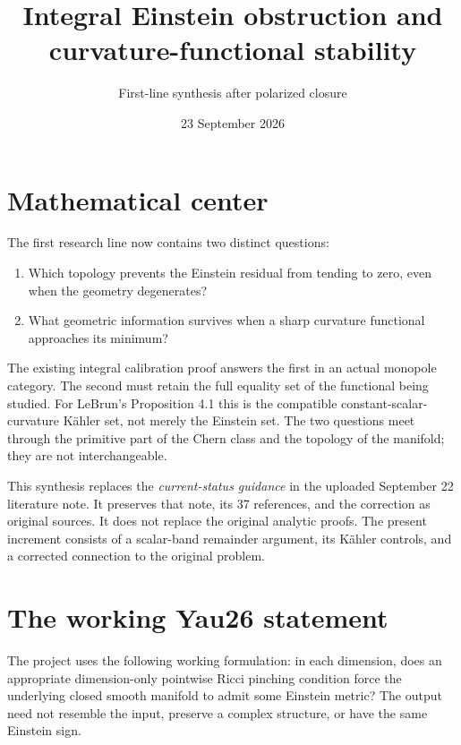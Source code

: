 \documentclass[
  11pt,
]{article}
\title{Integral Einstein obstruction and curvature-functional stability}
\subtitle{First-line synthesis after polarized closure}
\author{}
\date{23 September 2026}
\providecommand{\tightlist}{%
  \setlength{\itemsep}{0pt}\setlength{\parskip}{0pt}}
\begin{document}
\maketitle

\hypertarget{mathematical-center}{%
\section{Mathematical center}\label{mathematical-center}}

The first research line now contains two distinct questions:

\begin{enumerate}
\def\labelenumi{\arabic{enumi}.}
\tightlist
\item
  Which topology prevents the Einstein residual from tending to zero,
  even when the geometry degenerates?
\item
  What geometric information survives when a sharp curvature functional
  approaches its minimum?
\end{enumerate}

The existing integral calibration proof answers the first in an actual
monopole category. The second must retain the full equality set of the
functional being studied. For LeBrun's Proposition 4.1 this is the
compatible constant-scalar-curvature Kähler set, not merely the Einstein
set. The two questions meet through the primitive part of the Chern
class and the topology of the manifold; they are not interchangeable.

This synthesis replaces the \emph{current-status guidance} in the
uploaded September 22 literature note. It preserves that note, its 37
references, and the correction as original sources. It does not replace
the original analytic proofs. The present increment consists of a
scalar-band remainder argument, its Kähler controls, and a corrected
connection to the original problem.

\hypertarget{the-working-yau26-statement}{%
\section{The working Yau26
statement}\label{the-working-yau26-statement}}

The project uses the following working formulation: in each dimension,
does an appropriate dimension-only pointwise Ricci pinching condition
force the underlying closed smooth manifold to admit some Einstein
metric? The output need not resemble the input, preserve a complex
structure, or have the same Einstein sign.
\end{document}
